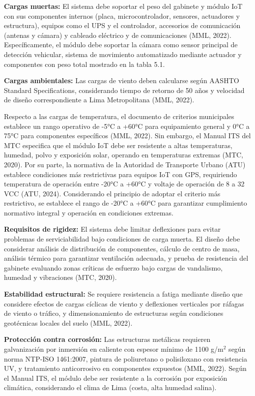 \documentclass[12pt,a4paper,oneside]{report}
\begin{document}
\textbf{Cargas muertas:} El sistema debe soportar el peso del gabinete y módulo IoT con sus componentes internos (placa, microcontrolador, sensores, actuadores y estructura), equipos como el UPS y el controlador, accesorios de comunicación (antenas y cámara) y cableado eléctrico y de comunicaciones (MML, 2022). Específicamente, el módulo debe soportar la cámara como sensor principal de detección vehicular, sistema de movimiento automatizado mediante actuador y componentes con peso total mostrado en la tabla 5.1.

\textbf{Cargas ambientales:} Las cargas de viento deben calcularse según AASHTO Standard Specifications, considerando tiempo de retorno de 50 años y velocidad de diseño correspondiente a Lima Metropolitana (MML, 2022).

Respecto a las cargas de temperatura, el documento de criterios municipales establece un rango operativo de -5°C a +60°C para equipamiento general y 0°C a 75°C para componentes específicos (MML, 2022). Sin embargo, el Manual ITS del MTC especifica que el módulo IoT debe ser resistente a altas temperaturas, humedad, polvo y exposición solar, operando en temperaturas extremas (MTC, 2020). Por su parte, la normativa de la Autoridad de Transporte Urbano (ATU) establece condiciones más restrictivas para equipos IoT con GPS, requiriendo temperatura de operación entre -20°C a +60°C y voltaje de operación de 8 a 32 VCC (ATU, 2024). Considerando el principio de adoptar el criterio más restrictivo, se establece el rango de -20°C a +60°C para garantizar cumplimiento normativo integral y operación en condiciones extremas.

\textbf{Requisitos de rigidez:} El sistema debe limitar deflexiones para evitar problemas de serviciabilidad bajo condiciones de carga muerta. El diseño debe considerar análisis de distribución de componentes, cálculo de centro de masa, análisis térmico para garantizar ventilación adecuada, y prueba de resistencia del gabinete evaluando zonas críticas de esfuerzo bajo cargas de vandalismo, humedad y vibraciones (MTC, 2020).

\textbf{Estabilidad estructural:} Se requiere resistencia a fatiga mediante diseño que considere efectos de cargas cíclicas de viento y deflexiones verticales por ráfagas de viento o tráfico, y dimensionamiento de estructuras según condiciones geotécnicas locales del suelo (MML, 2022).

\textbf{Protección contra corrosión:} Las estructuras metálicas requieren galvanización por inmersión en caliente con espesor mínimo de 1100 g/m\ensuremath{^{2}} según norma NTP-ISO 1461:2007, pintura de poliuretano o polisiloxano con resistencia UV, y tratamiento anticorrosivo en componentes expuestos (MML, 2022). Según el Manual ITS, el módulo debe ser resistente a la corrosión por exposición climática, considerando el clima de Lima (costa, alta humedad salina).
\end{document}
